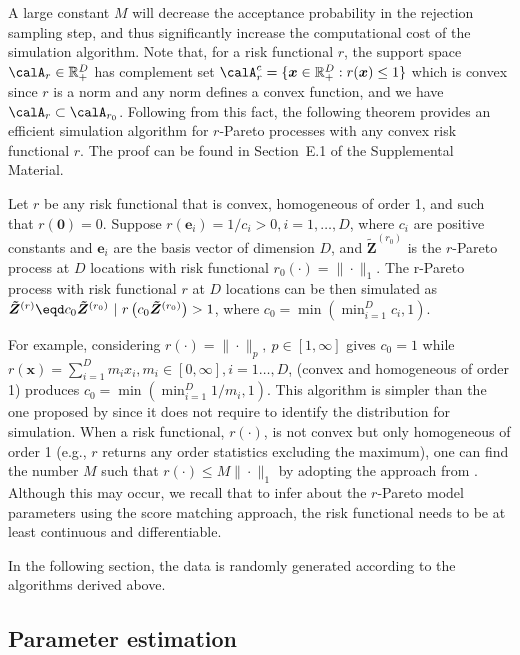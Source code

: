 \documentclass[12pt]{article}
\begin{document}
A large constant $M$ will decrease the acceptance probability in the rejection sampling step, and thus significantly increase the computational cost of the simulation algorithm. Note that, for a risk functional $r$, the support space $\calA_r \in \mathbb R_+^D$ has complement set $\calA_r^c=\{\bm x\in\mathbb R_+^D: r(\bm x)\leq 1\}$ which is convex since $r$ is a norm and any norm defines a convex function, and we have $\calA_r\subset \calA_{r_0}$. Following from this fact, the following theorem provides an efficient simulation algorithm for $r$-Pareto processes with any convex risk functional $r$. The proof can be found in Section~E.1 of the Supplemental Material. 
%    
\begin{theorem}\label{thm:r_pareto_simulation}
Let $r$ be any risk functional that is convex, homogeneous of order 1, and such that $r(\bm 0)=0$. Suppose $r(\bm e_i)=1/c_i>0, i=1,\dots,D$, where $c_i$ are positive constants and $\bm e_i$ are the basis vector of dimension $D$, and $\bm{\tilde Z}^{(r_0)}$ is the $r$-Pareto process at $D$ locations with risk functional $r_0(\cdot)=\|\cdot\|_1$. The r-Pareto process with risk functional $r$ at $D$ locations can be then simulated as $\bm{\tilde Z}^{(r)}\eqd c_0\bm{\tilde Z}^{(r_0)}\ | \ r\left(c_0\bm{\tilde Z}^{(r_0)}\right) > 1$, where $c_0 = \min(\min_{i=1}^D c_i,1)$.
\end{theorem}
%
For example, considering $r(\cdot)=\|\cdot\|_p,\ p\in [1,\infty]$ gives $c_0 = 1$ while $r(\bm x)=\sum_{i=1}^D m_ix_i, m_i\in [0,\infty],i=1\dots,D$, (convex and homogeneous of order 1) produces $c_0=\min(\min_{i=1}^D 1/m_i,1)$. This algorithm is simpler than the one proposed by \citet{Dombry.etal:2024} since it does not require to identify the distribution for simulation.
When a risk functional, $r(\cdot)$, is not convex but only homogeneous of order 1 (e.g., $r$ returns any order statistics excluding the maximum), one can find the number $M$ such that $r (\cdot)\leq M\|\cdot\|_1$ by adopting the approach from \citet{Dombry.etal:2024}. Although this may occur, we recall that to infer about the $r$-Pareto model parameters using the score matching approach, the risk functional needs to be at least continuous and differentiable. 

In the following section, the data is randomly generated according to the algorithms derived above.

\subsection{Parameter estimation}
\label{ssec:par_est}
\end{document}
